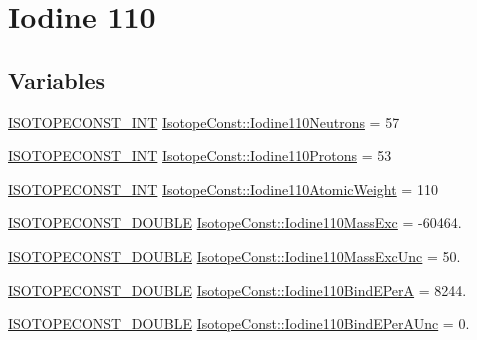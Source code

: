 \hypertarget{group___isotope_const-_iodine-_i110}{}\section{Iodine 110}
\label{group___isotope_const-_iodine-_i110}
\subsection*{Variables}
\begin{DoxyCompactItemize}
\item 
\mbox{\hyperlink{group___isotope_const-_macros_ga5f18360b3e99483a35c32d789e62621c}{I\+S\+O\+T\+O\+P\+E\+C\+O\+N\+S\+T\+\_\+\+I\+NT}} \mbox{\hyperlink{group___isotope_const-_iodine-_i110_ga0a4f903111289070a828c6efc28e3bf4}{Isotope\+Const\+::\+Iodine110\+Neutrons}} = 57
\item 
\mbox{\hyperlink{group___isotope_const-_macros_ga5f18360b3e99483a35c32d789e62621c}{I\+S\+O\+T\+O\+P\+E\+C\+O\+N\+S\+T\+\_\+\+I\+NT}} \mbox{\hyperlink{group___isotope_const-_iodine-_i110_gaf1e6abe1dadc6d2c8589e141d32b9b98}{Isotope\+Const\+::\+Iodine110\+Protons}} = 53
\item 
\mbox{\hyperlink{group___isotope_const-_macros_ga5f18360b3e99483a35c32d789e62621c}{I\+S\+O\+T\+O\+P\+E\+C\+O\+N\+S\+T\+\_\+\+I\+NT}} \mbox{\hyperlink{group___isotope_const-_iodine-_i110_ga618566544f0bcbac08960f7e257a66ca}{Isotope\+Const\+::\+Iodine110\+Atomic\+Weight}} = 110
\item 
\mbox{\hyperlink{group___isotope_const-_macros_ga8f45a7272ce02c0b4c65c44636ed719a}{I\+S\+O\+T\+O\+P\+E\+C\+O\+N\+S\+T\+\_\+\+D\+O\+U\+B\+LE}} \mbox{\hyperlink{group___isotope_const-_iodine-_i110_ga610ff49c49acb95b2a2c1628a307485c}{Isotope\+Const\+::\+Iodine110\+Mass\+Exc}} = -\/60464.
\item 
\mbox{\hyperlink{group___isotope_const-_macros_ga8f45a7272ce02c0b4c65c44636ed719a}{I\+S\+O\+T\+O\+P\+E\+C\+O\+N\+S\+T\+\_\+\+D\+O\+U\+B\+LE}} \mbox{\hyperlink{group___isotope_const-_iodine-_i110_gac5fa7fefc688c38d7ae8586e029a0508}{Isotope\+Const\+::\+Iodine110\+Mass\+Exc\+Unc}} = 50.
\item 
\mbox{\hyperlink{group___isotope_const-_macros_ga8f45a7272ce02c0b4c65c44636ed719a}{I\+S\+O\+T\+O\+P\+E\+C\+O\+N\+S\+T\+\_\+\+D\+O\+U\+B\+LE}} \mbox{\hyperlink{group___isotope_const-_iodine-_i110_gae2e89f953bd722b5941d5ba813f38caf}{Isotope\+Const\+::\+Iodine110\+Bind\+E\+PerA}} = 8244.
\item 
\mbox{\hyperlink{group___isotope_const-_macros_ga8f45a7272ce02c0b4c65c44636ed719a}{I\+S\+O\+T\+O\+P\+E\+C\+O\+N\+S\+T\+\_\+\+D\+O\+U\+B\+LE}} \mbox{\hyperlink{group___isotope_const-_iodine-_i110_ga8c15767d6d23b6ce088c4179870392e2}{Isotope\+Const\+::\+Iodine110\+Bind\+E\+Per\+A\+Unc}} = 0.

\end{DoxyCompactItemize}
